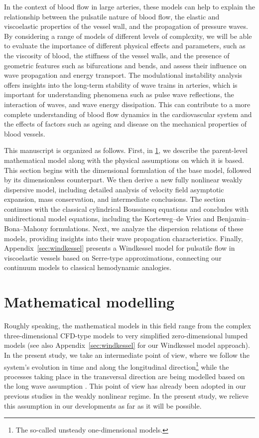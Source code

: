 \documentclass[alpha-refs, 12pt]{wiley-article}
\begin{document}
In the context of blood flow in large arteries, these models can help to explain the relationship between the pulsatile nature of blood flow, the elastic and viscoelastic properties of the vessel wall, and the propagation of pressure waves. By considering a range of models of different levels of complexity, we will be able to evaluate the importance of different physical effects and parameters, such as the viscosity of blood, the stiffness of the vessel walls, and the presence of geometric features such as bifurcations and bends, and assess their influence on wave propagation and energy transport. The modulational instability analysis offers insights into the long-term stability of wave trains in arteries, which is important for understanding phenomena such as pulse wave reflections, the interaction of waves, and wave energy dissipation. This can contribute to a more complete understanding of blood flow dynamics in the cardiovascular system and the effects of factors such as ageing and disease on the mechanical properties of blood vessels.

This manuscript is organized as follows. First, in \cref{sec:model}, we describe the parent-level mathematical model along with the physical assumptions on which it is based. This section begins with the dimensional formulation of the base model, followed by its dimensionless counterpart. We then derive a new fully nonlinear weakly dispersive model, including detailed analysis of velocity field asymptotic expansion, mass conservation, and intermediate conclusions. The section continues with the classical cylindrical Boussinesq equations and concludes with unidirectional model equations, including the Korteweg--de Vries and Benjamin--Bona--Mahony formulations. Next, we analyze the dispersion relations of these models, providing insights into their wave propagation characteristics. Finally, Appendix~\ref{sec:windkessel} presents a Windkessel model for pulsatile flow in viscoelastic vessels based on Serre-type approximations, connecting our continuum models to classical hemodynamic analogies.

\section{Mathematical modelling}
\label{sec:model}

Roughly speaking, the mathematical models in this field range from the complex three-dimensional CFD-type models \cite{Roe2005} to very simplified zero-dimensional lumped models \cite{Milisic2004, Alastruey2008} (see also Appendix~\ref{sec:windkessel} for our Windkessel model approach). In the present study, we take an intermediate point of view, where we follow the system's evolution in time and along the longitudinal direction\footnote{The so-called unsteady one-dimensional models.} \cite{Sherwin2003, Alastruey2011} while the processes taking place in the transversal direction are being modelled based on the long wave assumption \cite{Lavrentiev1947, Serre1956, BCL, Khakimzyanov2019}. This point of view has already been adopted in our previous studies \cite{Mitsotakis2018, Mitsotakis2019} in the weakly nonlinear regime. In the present study, we relieve this assumption in our developments as far as it will be possible.
\end{document}
